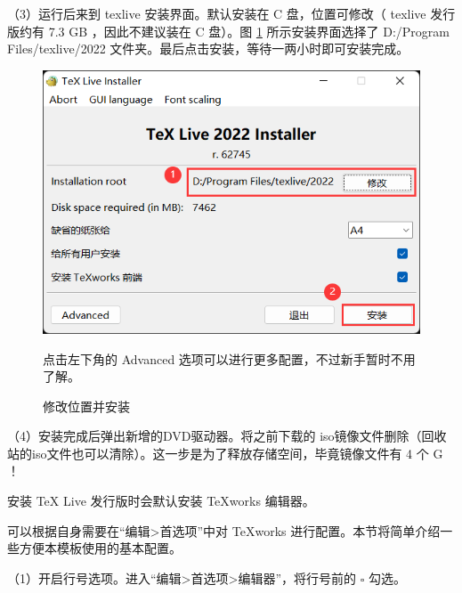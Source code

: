 （3）运行后来到 texlive 安装界面。默认安装在 C 盘，位置可修改（ texlive 发行版约有 7.3 GB ，因此不建议装在 C 盘）。图 \ref{fig:tools:texliveInstaller} 所示安装界面选择了 D:/Program Files/texlive/2022 文件夹。最后点击安装，等待一两小时即可安装完成。

\begin{figure}[H]  %
  \centering  %
  \includegraphics[scale=.5]{figure/thesis/texliveInstaller.png}  %

  { 点击左下角的 Advanced 选项可以进行更多配置，不过新手暂时不用了解。}  %
  \caption{修改位置并安装}  %
  \label{fig:tools:texliveInstaller}  %
\end{figure}

（4）安装完成后弹出新增的DVD驱动器。将之前下载的 iso镜像文件删除（回收站的iso文件也可以清除）。这一步是为了释放存储空间，毕竟镜像文件有 4 个 G ！


安装 \TeX{} Live 发行版时会默认安装 \TeX{works} 编辑器。

可以根据自身需要在“编辑>首选项”中对 \TeX{works} 进行配置。本节将简单介绍一些方便本模板使用的基本配置。

（1）开启行号选项。进入“编辑>首选项>编辑器”，将行号前的 $\square$ 勾选。

